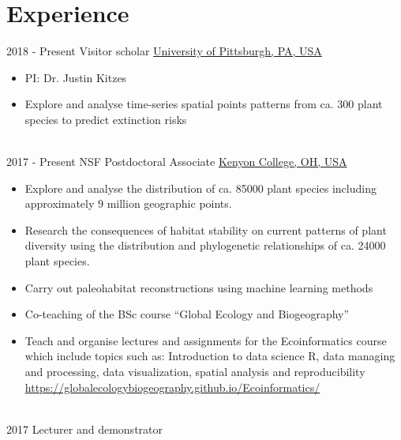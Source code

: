 \documentclass[letterpaper]{twentysecondcv} %
\begin{document}
\makeprofile %


\section{Experience}

\begin{twenty} %
\twentyitem
    	{2018 -}
		{Present}
        {Visitor scholar}
        {\href{https://www.biology.pitt.edu/}{University of Pittsburgh, PA, USA}}
        {}
        {\begin{itemize}
        \item PI: Dr. Justin Kitzes
        \item Explore and analyse time-series spatial points patterns from ca. 300 plant species to predict extinction risks
        \end{itemize}}
        \\
	\twentyitem
    	{2017 -}
		{Present}
        {NSF Postdoctoral Associate}
        {\href{https://www.kenyon.edu}{Kenyon College, OH, USA}}
        {}
        {
        {\begin{itemize}
        \item Explore and analyse the distribution of ca. 85000 plant species including approximately 9 million geographic points. 
        \item Research the consequences of habitat stability on current patterns of plant diversity using the distribution and phylogenetic relationships of ca. 24000 plant species. 
        \item Carry out paleohabitat reconstructions using machine learning methods
        \item Co-teaching of the BSc course ``Global Ecology and Biogeography'' 
        \item Teach and organise lectures and assignments for the Ecoinformatics course which include topics such as: 
        Introduction to data science R, data managing and processing, data visualization, spatial analysis and reproducibility \url{https://globalecologybiogeography.github.io/Ecoinformatics/}		
    \end{itemize}}
        }
    \\   
     \twentyitem
   		{2017}
		{}
        {Lecturer and demonstrator}

\end{twenty}
\end{document}
